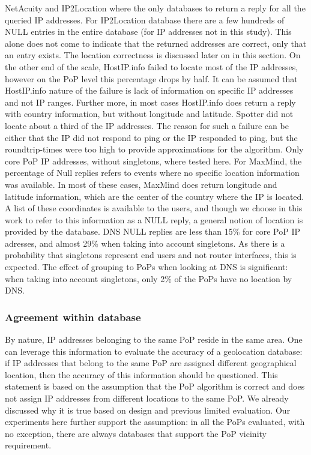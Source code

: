 NetAcuity and IP2Location where the only databases to return a reply
for all the queried IP addresses. For IP2Location database there are
a few hundreds of NULL entries in the entire database (for IP
addresses not in this study). This alone does not come to indicate
that the returned addresses are correct, only that an entry exists.
The location correctness is discussed later on in this section. On
the other end of the scale, HostIP.info failed to locate most of the
IP addresses, however on the PoP level this percentage drops by
half. It can be assumed that HostIP.info nature of the failure is
lack of information on specific IP addresses and not IP ranges.
Further more, in most cases HostIP.info does return a reply with
country information, but without longitude and latitude. Spotter did
not locate about a third of the IP addresses. The reason for such a
failure can be either that the IP did not respond to ping or the IP
responded to ping, but the roundtrip-times were too high to provide
approximations for the algorithm. Only core PoP IP addresses,
without singletons, where tested here. For MaxMind, the percentage
of Null replies refers to events where no specific location
information was available. In most of these cases, MaxMind does
return longitude and latitude information, which are the center of
the country where the IP is located. A list of these coordinates is
available to the users, and though we choose in this work to refer
to this information as a NULL reply, a general notion of location is
provided by the database. DNS NULL replies are less than 15\% for
core PoP IP adresses, and almost 29\% when taking into account
singletons. As there is a probability that singletons represent end
users and not router interfaces, this is expected. The effect of
grouping to PoPs when looking at DNS is significant: when taking
into account singletons, only 2\% of the PoPs have no location by
DNS.


\subsubsection{Agreement within database}
By nature, IP addresses belonging to the same PoP reside in the same
area. One can leverage this information to evaluate the accuracy of
a geolocation database: if IP addresses that belong to the same PoP
are assigned different geographical location, then the accuracy of
this information should be questioned. This statement is based on
the assumption that the PoP algorithm is correct and does not assign
IP addresses from different locations to the same PoP. We
already discussed why it is true based on design and previous
limited evaluation.  Our experiments here further support the assumption:
in all the PoPs evaluated, with no
exception, there are always databases that support the PoP vicinity
requirement.


